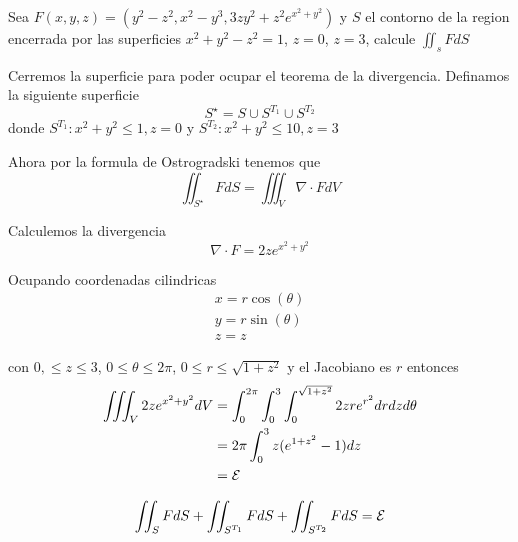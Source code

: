 \documentclass[../main.tex]{subfiles}
\begin{document}
\begin{problem}
  Sea $F(x, y, z) = (y^{2} - z^{2}, x^{2} - y^{3}, 3zy^{2} + z^{2}e^{x^{2} + y^{2}})$ y $S$ el contorno de la region encerrada por las superficies $x^{2} + y^{2} - z^{2} = 1$, $z = 0$, $z = 3$, calcule $\iint_{s} F dS$
\end{problem}
\begin{solution}
  Cerremos la superficie para poder ocupar el teorema de la divergencia. Definamos la siguiente superficie
  \begin{equation*}
    S^{\star} = S \cup S^{T_{1}} \cup S^{T_{2}}
  \end{equation*}
  donde $S^{T_{1}}: x^{2} + y^{2} \leq 1,  z = 0$ y $S^{T_{2}}: x^{2} + y^{2} \leq 10, z = 3$

  Ahora por la formula de Ostrogradski tenemos que
  \begin{equation*}
    \iint_{S^{\star}} F dS = \iiint_{V} \nabla \cdot F dV
  \end{equation*}

  Calculemos la divergencia
  \begin{equation*}
    \nabla \cdot F = 2ze^{x^{2} + y^{2}}
  \end{equation*}

  Ocupando coordenadas cilindricas
  \begin{gather*}
    x = r \cos (\theta)\\
    y = r \sin (\theta)\\
    z = z
  \end{gather*}

  con $0, \leq z \leq 3$, $0 \leq \theta \leq 2\pi$, $0 \leq r \leq \sqrt{1 + z^{2}}$ y el Jacobiano es $r$ entonces
  \begin{align*}
    \iiint_{V} 2ze^{x^{2} + y^{2}} dV &= \int_{0}^{2\pi}\int_{0}^{3}\int_{0}^{\sqrt{1 + z^{2}}} 2zre^{r^{2}} dr dz d\theta\\
                                      &= 2\pi \int_{0}^{3} z(e^{1 + z^{2}} - 1) dz\\
    &= \mathcal{E}
  \end{align*}

  \begin{equation*}
    \iint_S F dS + \iint_{S^{T_1}} F dS + \iint_{S^{T_2}} F dS = \mathcal{E}
  \end{equation*}
\end{solution}
\end{document}
